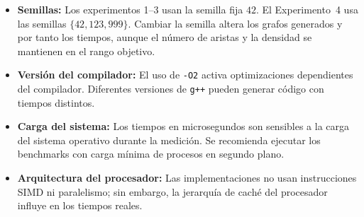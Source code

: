 \begin{itemize}
  \item \textbf{Semillas:} Los experimentos 1–3 usan la semilla fija $42$.
    El Experimento~4 usa las semillas $\{42, 123, 999\}$.
    Cambiar la semilla altera los grafos generados y por tanto los tiempos,
    aunque el número de aristas y la densidad se mantienen en el rango
    objetivo.
  \item \textbf{Versión del compilador:} El uso de \texttt{-O2} activa
    optimizaciones dependientes del compilador. Diferentes versiones de
    \texttt{g++} pueden generar código con tiempos distintos.
  \item \textbf{Carga del sistema:} Los tiempos en microsegundos son
    sensibles a la carga del sistema operativo durante la medición. Se
    recomienda ejecutar los benchmarks con carga mínima de procesos en
    segundo plano.
  \item \textbf{Arquitectura del procesador:} Las implementaciones no usan
    instrucciones SIMD ni paralelismo; sin embargo, la jerarquía de caché
    del procesador influye en los tiempos reales.
\end{itemize}
